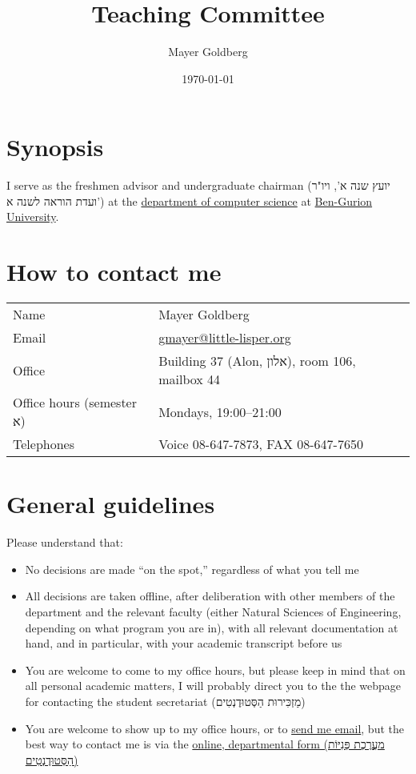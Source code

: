 \documentclass[11pt]{article}
\author{Mayer Goldberg}
\date{\today}
\title{Teaching Committee}
\begin{document}
\maketitle

\section{Synopsis}
\label{sec:org3ec8e9c}

I serve as the freshmen advisor and undergraduate chairman (יועץ שנה א', ויו"ר ועדת הוראה לשנה א') at the \href{http://www.cs.bgu.ac.il/}{department of computer science} at \href{http://www.bgu.ac.il/}{Ben-Gurion University}. 

\section{How to contact me}
\label{sec:org23d015c}

\begin{center}
\begin{tabular}{ll}
Name & Mayer Goldberg\\
Email & \href{mailto:gmayer@little-lisper.org}{gmayer@little-lisper.org}\\
Office & Building 37 (Alon, אלון), room 106, mailbox 44\\
Office hours (semester א) & Mondays, 19:00--21:00\\
Telephones & Voice 08-647-7873, FAX 08-647-7650\\
\end{tabular}
\end{center}

\section{General guidelines}
\label{sec:org4f86cbd}

Please understand that:
\begin{itemize}
\item No decisions are made \textquotedblleft{}on the spot,\textquotedblright{} regardless of what you tell me
\item All decisions are taken offline, after deliberation with other members of the department and the relevant faculty (either Natural Sciences of Engineering, depending on what program you are in), with all relevant documentation at hand, and in particular, with your academic transcript before us
\item You are welcome to come to my office hours, but please keep in mind that on all personal academic matters, I will probably direct you to the the webpage for contacting the student secretariat (מַזְכִּירוּת הַסְּטוּדֶנְטִים)
\item You are welcome to show up to my office hours, or to \href{mailto:gmayer@little-lisper.org}{send me email}, but the best way to contact me is via the \href{https://cs-sr.cs.bgu.ac.il/}{online, departmental form (מַעֲרֶכֶת פְּנִיּוֹת הַסְּטוּדֶנְטִים)}
\end{itemize}
\end{document}

